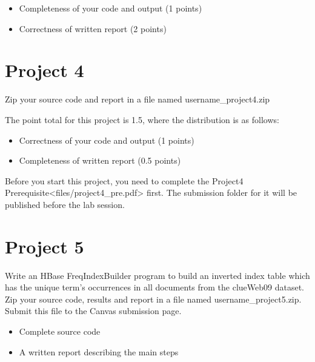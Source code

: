 \begin{itemize}
\tightlist
\item
  Completeness of your code and output (1 points)
\item
  Correctness of written report (2 points)
\end{itemize}



\chapter{Project 4}\label{project-4}

Zip your source code and report in a file named username\_project4.zip

The point total for this project is 1.5, where the distribution is as
follows:

\begin{itemize}
\tightlist
\item
  Correctness of your code and output (1 points)
\item
  Completeness of written report (0.5 points)
\end{itemize}

Before you start this project, you need to complete the
Project4 Prerequisite\textless{}files/project4\_pre.pdf\textgreater{}
first. The submission folder for it will be published before the lab
session.




\chapter{Project 5}\label{project-5}

Write an HBase FreqIndexBuilder program to build an inverted index table
which has the unique term's occurrences in all documents from the
clueWeb09 dataset. Zip your source code, results and report in a file
named username\_project5.zip. Submit this file to the Canvas submission
page.

\begin{itemize}
\tightlist
\item
  Complete source code
\item
  A written report describing the main steps
\end{itemize}

